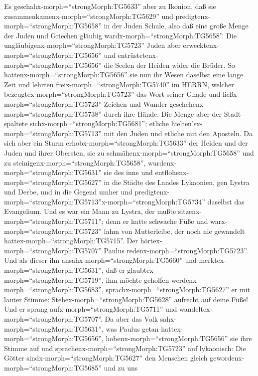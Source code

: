  Es geschahx-morph=``strongMorph:TG5633'' aber zu Ikonion,
daß sie zusammenkamenx-morph=``strongMorph:TG5629'' und
predigtenx-morph=``strongMorph:TG5658'' in der Juden Schule, also daß
eine große Menge der Juden und Griechen gläubig
wardx-morph=``strongMorph:TG5658''.  Die
ungläubigenx-morph=``strongMorph:TG5723'' Juden aber
erwecktenx-morph=``strongMorph:TG5656'' und
entrüstetenx-morph=``strongMorph:TG5656'' die Seelen der Heiden wider
die Brüder.  So hattenx-morph=``strongMorph:TG5656'' sie nun
ihr Wesen daselbst eine lange Zeit und lehrten
freix-morph=``strongMorph:TG5740'' im HERRN, welcher
bezeugtex-morph=``strongMorph:TG5723'' das Wort seiner Gnade und
ließx-morph=``strongMorph:TG5723'' Zeichen und Wunder
geschehenx-morph=``strongMorph:TG5738'' durch ihre Hände. 
Die Menge aber der Stadt spaltete sichx-morph=``strongMorph:TG5681'';
etliche hielten'sx-morph=``strongMorph:TG5713'' mit den Juden und
etliche mit den Aposteln.  Da sich aber ein Sturm
erhobx-morph=``strongMorph:TG5633'' der Heiden und der Juden und ihrer
Obersten, sie zu schmähenx-morph=``strongMorph:TG5658'' und zu
steinigenx-morph=``strongMorph:TG5658'', 
wurdenx-morph=``strongMorph:TG5631'' sie des inne und
entflohenx-morph=``strongMorph:TG5627'' in die Städte des Landes
Lykaonien, gen Lystra und Derbe, und in die Gegend umher 
und
predigtenx-morph=``strongMorph:TG5713''x-morph=``strongMorph:TG5734''
daselbst das Evangelium.  Und es war ein Mann zu Lystra, der
mußte sitzenx-morph=``strongMorph:TG5711''; denn er hatte schwache Füße
und warx-morph=``strongMorph:TG5723'' lahm von Mutterleibe, der noch nie
gewandelt hattex-morph=``strongMorph:TG5715''.  Der
hörtex-morph=``strongMorph:TG5707'' Paulus
redenx-morph=``strongMorph:TG5723''. Und als dieser ihn
ansahx-morph=``strongMorph:TG5660'' und
merktex-morph=``strongMorph:TG5631'', daß er
glaubtex-morph=``strongMorph:TG5719'', ihm möchte geholfen
werdenx-morph=``strongMorph:TG5683'', 
sprachx-morph=``strongMorph:TG5627'' er mit lauter Stimme:
Stehex-morph=``strongMorph:TG5628'' aufrecht auf deine Füße! Und er
sprang aufx-morph=``strongMorph:TG5711'' und
wandeltex-morph=``strongMorph:TG5707''.  Da aber das Volk
sahx-morph=``strongMorph:TG5631'', was Paulus getan
hattex-morph=``strongMorph:TG5656'', hobenx-morph=``strongMorph:TG5656''
sie ihre Stimme auf und sprachenx-morph=``strongMorph:TG5723'' auf
lykaonisch: Die Götter sindx-morph=``strongMorph:TG5627'' den Menschen
gleich gewordenx-morph=``strongMorph:TG5685'' und zu uns
